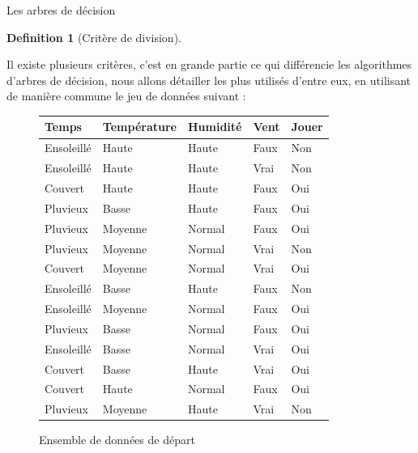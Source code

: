 \documentclass[a4paper, 11pt]{report}
\newtheorem{definition}{Definition}
\newcommand{\set}[1]{\ensuremath{\overline{#1}}}
\newcommand{\tupleset}{\ensuremath{\mathcal{T}}}
\newcommand{\attributset}{\ensuremath{\mathcal{AT}}}
\begin{document}
\begin{chapter}{Les arbres de décision}
\begin{definition}[Critère de division]



\end{definition}

Il existe plusieurs critères, c'est en grande partie ce qui différencie les algorithmes d'arbres de décision, nous allons détailler les plus utilisés d'entre eux, en utilisant de manière commune le jeu de données suivant :
\begin{figure}[!h]
\begin{center}

\begin{tabular}{| l | l | l | l | l |}
\hline
\rowcolor{gray!25}
Temps & Température & Humidité & Vent & Jouer \\
\hline
Ensoleillé & Haute & Haute & Faux & Non \\
\hline
Ensoleillé & Haute & Haute & Vrai & Non \\
\hline
Couvert & Haute & Haute & Faux & Oui \\
\hline
Pluvieux & Basse & Haute & Faux & Oui \\
\hline
Pluvieux & Moyenne & Normal & Faux & Oui \\
\hline
Pluvieux & Moyenne & Normal & Vrai & Non \\
\hline
Couvert & Moyenne & Normal & Vrai & Oui \\
\hline
Ensoleillé & Basse & Haute & Faux & Non \\
\hline
Ensoleillé & Moyenne & Normal & Faux & Oui \\
\hline
Pluvieux & Basse & Normal & Faux & Oui \\
\hline
Ensoleillé & Basse & Normal & Vrai & Oui \\
\hline
Couvert & Basse & Haute & Vrai & Oui \\
\hline
Couvert & Haute & Normal & Faux & Oui \\
\hline
Pluvieux & Moyenne & Haute & Vrai & Non \\
\hline
\end{tabular}
\caption{Ensemble de données de départ}
\end{center}
\end{figure}

\end{chapter}
\end{document}
